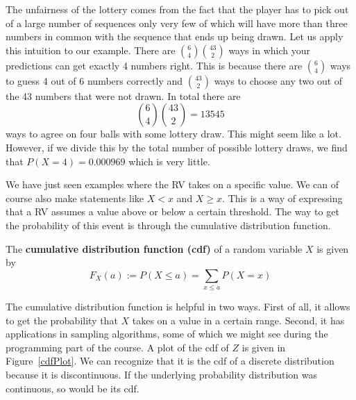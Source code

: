 The unfairness of the lottery comes from the fact that the player has to pick out of a large number of sequences only very few of which will have more than three
numbers in common with the sequence that ends up being drawn. Let us apply this intuition to our example.
There are $ \binom{6}{4}\binom{43}{2}$ ways in which your predictions can get exactly 4 numbers right.
This is because there are $ \binom{6}{4} $ ways to guess 4 out of 6 numbers correctly and $ \binom{43}{2} $ ways to choose any two out of the 43 numbers that were not 
drawn. In total there are 
\begin{equation}
\binom{6}{4}\binom{43}{2} = 13545
\end{equation}
ways to agree on four balls with some lottery draw. This might seem like a lot. However, if we divide this by the total number of possible lottery draws, we
find that $ P(X=4) = 0.000969 $ which is very little.   

We have just seen examples where the RV takes on a specific value. We can of course also make statements
like $ X < x $ and $ X \geq x $. This is a way of expressing that a RV assumes a value above or below a certain
threshold. The way to get the probability of this event is through the cumulative distribution function.

\newpage
\begin{Definition}
The \textbf{cumulative distribution function (cdf)} of a random variable $ X $ is given by
$$ F_{X}(a) := P(X \leq a) = {\underset{x \leq a}{\sum}}P(X=x) $$
\end{Definition}

The cumulative distribution function is helpful in two ways. First of all, it allows to get the probability that
$ X $ takes on a value in a certain range. Second, it has applications in sampling algorithms, some of which we might
see during the programming part of the course. A plot of the cdf of $ Z $ is given in Figure~\ref{cdfPlot}. We can recognize that it is the cdf of a discrete
distribution because it is discontinuous. If the underlying probability distribution was continuous, so would be its cdf.


